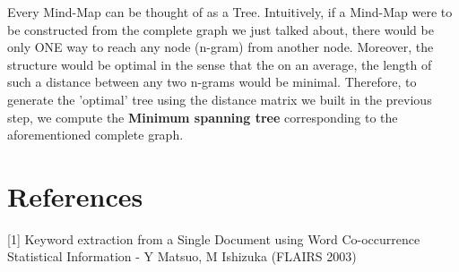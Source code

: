 \documentclass[11pt]{article}
\begin{document}
Every Mind-Map can be thought of as a Tree. Intuitively, if a Mind-Map were to be constructed from the complete graph we just talked about, there would be only ONE way to reach any node (n-gram) from another node. Moreover, the structure would be optimal in the sense that the on an average, the length of such a distance between any two n-grams would be minimal. Therefore, to generate the 'optimal' tree using the distance matrix we built in the previous step, we compute the \textbf{Minimum spanning tree} corresponding to the aforementioned complete graph.

\section{References}

[1] Keyword extraction from a Single Document using Word Co-occurrence Statistical Information - Y Matsuo, M Ishizuka (FLAIRS 2003)
\end{document}
